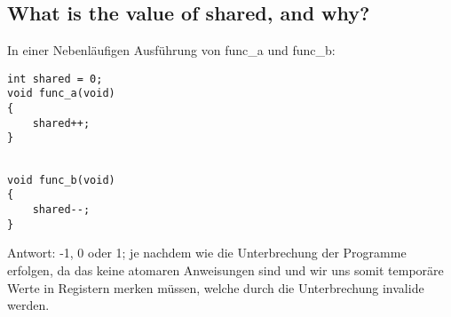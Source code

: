 \subsection{What is the value of shared, and why?}
In einer Nebenläufigen Ausführung von func\_a und func\_b:

\lstset{language=C}
\begin{minipage}{.5\textwidth}
\begin{lstlisting}
int shared = 0;
void func_a(void)
{
    shared++;
}
\end{lstlisting}
\end{minipage}
\begin{minipage}{.5\textwidth}
\begin{lstlisting}

void func_b(void)
{
    shared--;
}
\end{lstlisting}
\end{minipage}

Antwort: -1, 0 oder 1; je nachdem wie die Unterbrechung der Programme erfolgen, da das keine atomaren Anweisungen sind und wir uns somit temporäre Werte in Registern merken müssen, welche durch die Unterbrechung invalide werden.
